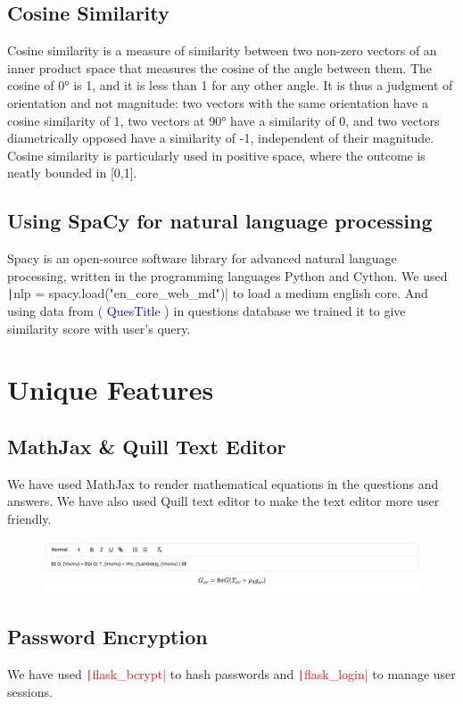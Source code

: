\documentclass{article}
\begin{document}
\subsection{Cosine Similarity}
Cosine similarity is a measure of similarity between two non-zero vectors of an inner product space that measures the cosine of the angle between them.
The cosine of 0° is 1, and it is less than 1 for any other angle.
It is thus a judgment of orientation and not magnitude: two vectors with the same orientation have a cosine similarity of 1, two vectors at 90° have a similarity of 0, and two vectors diametrically opposed have a similarity of -1, independent of their magnitude.
Cosine similarity is particularly used in positive space, where the outcome is neatly bounded in [0,1].
\subsection{Using SpaCy for natural language processing}
Spacy is an open-source software library for advanced natural language processing, written in the programming languages Python and Cython. We used \texttt|nlp = spacy.load("en_core_web_md")| to load a medium english core. And using data from \textcolor{blue}{( QuesTitle )} in questions database we trained it to give similarity score with user's query.
\section{Unique Features}
\subsection{MathJax \& Quill Text Editor}
We have used MathJax to render mathematical equations in the questions and answers. We have also used Quill text editor to make the text editor more user friendly.

\begin{figure}[h]
    \centering
    \includegraphics[width=13cm]{MathJax1.png}
    \end{figure}


\subsection{Password Encryption}
We have used \textcolor{red}{\texttt|flask_bcrypt|} to hash passwords and \textcolor{red}{\texttt|flask_login|} to manage user sessions.
\end{document}
